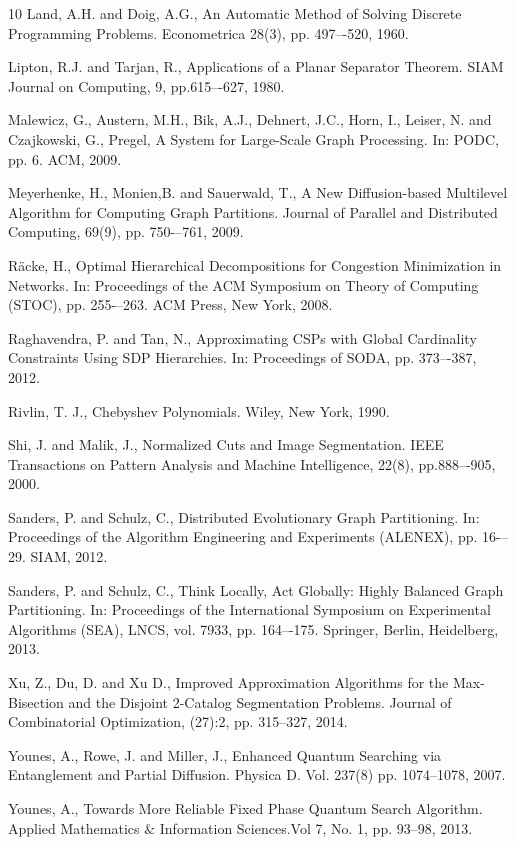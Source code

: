 \documentclass[a4paper]{article}
\begin{document}
\begin{thebibliography}{10}
Land, A.H. and Doig, A.G.,
An Automatic Method of Solving Discrete Programming Problems. 
Econometrica 28(3), pp. 497–-520, 1960.

Lipton, R.J. and Tarjan, R., 
Applications of a Planar Separator Theorem. 
SIAM Journal on Computing, 9, pp.615–-627, 1980.

Malewicz, G., Austern, M.H., Bik, A.J., Dehnert, J.C., Horn, I., Leiser, N. and Czajkowski, G., 
Pregel, A System for Large-Scale Graph Processing. 
In: PODC, pp. 6. ACM, 2009.

Meyerhenke, H., Monien,B. and Sauerwald, T.,
A New Diffusion-based Multilevel Algorithm for Computing Graph Partitions. 
Journal of Parallel and Distributed Computing, 69(9), pp. 750-–761, 2009.


Räcke, H.,
Optimal Hierarchical Decompositions for Congestion Minimization in Networks. 
In: Proceedings of the ACM Symposium on Theory of Computing (STOC), pp. 255-–263. ACM Press, New York, 2008. 

Raghavendra, P. and Tan, N.,
Approximating CSPs with Global Cardinality Constraints Using SDP Hierarchies. 
In: Proceedings of SODA, pp. 373–-387, 2012.



  Rivlin, T. J.,
  Chebyshev Polynomials.
  Wiley, New York, 1990.

Shi, J. and Malik, J.,
Normalized Cuts and Image Segmentation. 
IEEE Transactions on Pattern Analysis and Machine Intelligence, 22(8), pp.888–-905, 2000.
 




Sanders, P. and Schulz, C.,
Distributed Evolutionary Graph Partitioning. 
In: Proceedings of the Algorithm Engineering and Experiments (ALENEX), pp. 16-–29. SIAM, 2012.

Sanders, P. and Schulz, C.,
Think Locally, Act Globally: Highly Balanced Graph Partitioning. 
In: Proceedings of the International Symposium on Experimental Algorithms (SEA), LNCS, vol. 7933, pp. 164–-175. Springer, Berlin, Heidelberg, 2013.


Xu, Z., Du, D. and Xu D., 
Improved Approximation Algorithms for the Max-Bisection and the Disjoint 2-Catalog Segmentation Problems. 
Journal of Combinatorial Optimization, (27):2, pp. 315--327, 2014.


Younes, A., Rowe, J. and Miller, J.,
Enhanced Quantum Searching via Entanglement and Partial Diffusion. 
Physica D. Vol. 237(8) pp. 1074--1078, 2007.

Younes, A., 
Towards More Reliable Fixed Phase Quantum Search Algorithm.
Applied Mathematics $\&$ Information Sciences.Vol 7, No. 1, pp. 93--98, 2013.




\end{thebibliography}
\end{document}
